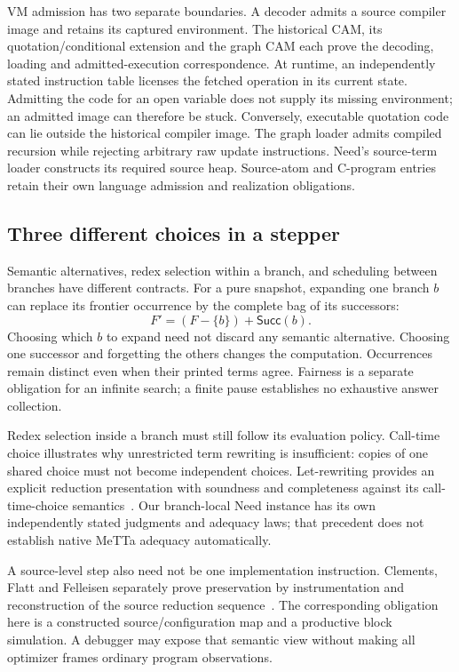 \documentclass[11pt,a4paper]{article}
\begin{document}
VM admission has two separate boundaries. A decoder admits a source compiler
image and retains its captured environment. The historical CAM, its
quotation/conditional extension and the graph CAM each prove the decoding,
loading and admitted-execution correspondence. At runtime, an independently
stated instruction table licenses the fetched operation in its current state.
Admitting the code for an open variable does not supply its missing environment;
an admitted image can therefore be stuck. Conversely, executable quotation code
can lie outside the historical compiler image. The graph loader admits compiled
recursion while rejecting arbitrary raw update instructions. Need's source-term
loader constructs its required source heap. Source-atom and C-program entries
retain their own language admission and realization obligations.

\subsection*{Three different choices in a stepper}

Semantic alternatives, redex selection within a branch, and scheduling between
branches have different contracts. For a pure snapshot, expanding one branch
$b$ can replace its frontier occurrence by the complete bag of its successors:
\[
  F'=(F-\{b\})+\mathsf{Succ}(b).
\]
Choosing which $b$ to expand need not discard any semantic alternative. Choosing
one successor and forgetting the others changes the computation. Occurrences
remain distinct even when their printed terms agree. Fairness is a separate
obligation for an infinite search; a finite pause establishes no exhaustive
answer collection.

Redex selection inside a branch must still follow its evaluation policy.
Call-time choice illustrates why unrestricted term rewriting is insufficient:
copies of one shared choice must not become independent choices. Let-rewriting
provides an explicit reduction presentation with soundness and completeness
against its call-time-choice semantics~\cite{LetRewriting}. Our branch-local
Need instance has its own independently stated judgments and adequacy laws;
that precedent does not establish native MeTTa adequacy automatically.

A source-level step also need not be one implementation instruction.
Clements, Flatt and Felleisen separately prove preservation by instrumentation
and reconstruction of the source reduction sequence~\cite{AlgebraicStepper}.
The corresponding obligation here is a constructed source/configuration map
and a productive block simulation. A debugger may expose that semantic view
without making all optimizer frames ordinary program observations.
\end{document}
